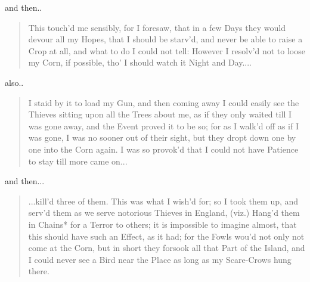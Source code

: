 \documentclass[a4paper]{article}
\begin{document}
and then..

\noindent
\begin{minipage}{1\textwidth}
\vspace{1em}
\begin{quotation}
{\ttfamily


This touch’d me sensibly, for I foresaw, that in a few Days they would devour all my Hopes, that I should be starv’d, and never be able to raise a Crop at all, and what to do I could not tell: However I resolv’d not to loose my Corn, if possible, tho’ I should watch it Night and Day....


}
\end{quotation}
\vspace{1em}
\end{minipage}

also..

\noindent
\begin{minipage}{1\textwidth}
\vspace{1em}
\begin{quotation}
{\ttfamily


I staid by it to load my Gun, and then coming away I could easily see the Thieves sitting upon all the Trees about me, as if they only waited till I was gone away, and the Event proved it to be so; for as I walk’d off as if I was gone, I was no sooner out of their sight, but they dropt down one by one into the Corn again. I was so provok’d that I could not have Patience to stay till more came on...


}
\end{quotation}
\vspace{1em}
\end{minipage}


and then...


\noindent
\begin{minipage}{1\textwidth}
\vspace{1em}
\begin{quotation}
{\ttfamily


...kill’d three of them. This was what I wish’d for; so I took them up, and serv’d them as we serve notorious Thieves in England, (viz.) Hang’d them in Chains* for a Terror to others; it is impossible to imagine almost, that this should have such an Effect, as it had; for the Fowls wou’d not only not come at the Corn, but in short they forsook all that Part of the Island, and I could never see a Bird near the Place as long as my Scare-Crows hung there.


}
\end{quotation}
\vspace{1em}
\end{minipage}
\end{document}
